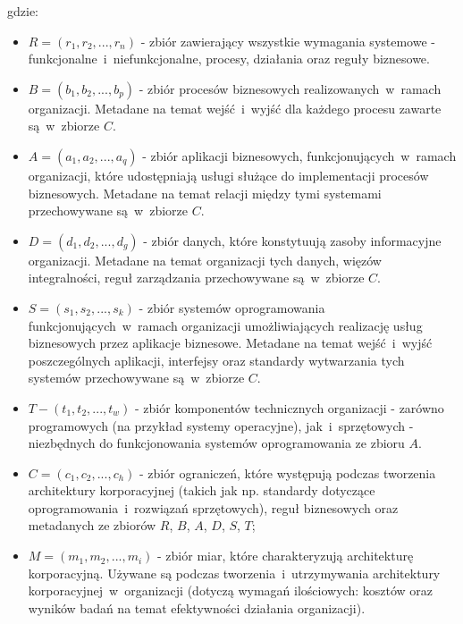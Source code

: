 gdzie:
\begin{itemize}
\item{$R = (r_{1}, r_{2},..., r_{n})$ - zbiór zawierający wszystkie wymagania systemowe - funkcjonalne~i~niefunkcjonalne, procesy, działania oraz reguły biznesowe.}
\item{$B = (b_{1}, b_{2},..., b_{p})$ - zbiór procesów biznesowych realizowanych~w~ramach organizacji. Metadane na temat wejść~i~wyjść dla każdego procesu zawarte są~w~zbiorze $C$.}
\item{$A = (a_{1}, a_{2},..., a_{q})$ - zbiór aplikacji biznesowych, funkcjonujących~w~ramach organizacji, które udostępniają usługi służące do implementacji procesów biznesowych. Metadane na temat relacji między tymi systemami przechowywane są~w~zbiorze $C$.}
\item{$D = (d_{1}, d_{2},..., d_{g})$ - zbiór danych, które konstytuują zasoby informacyjne organizacji. Metadane na temat organizacji tych danych, więzów integralności, reguł zarządzania przechowywane są~w~zbiorze $C$.}
\item{$S = (s_{1}, s_{2},..., s_{k})$ - zbiór systemów oprogramowania funkcjonujących~w~ramach organizacji umożliwiających realizację usług biznesowych przez aplikacje biznesowe. Metadane na temat wejść~i~wyjść poszczególnych aplikacji, interfejsy oraz standardy wytwarzania tych systemów przechowywane są~w~zbiorze $C$.}
\item{$T - (t_{1}, t_{2},..., t_{w})$ - zbiór komponentów technicznych organizacji - zarówno programowych (na przykład systemy operacyjne), jak~i~sprzętowych - niezbędnych do funkcjonowania systemów oprogramowania ze zbioru $A$.}
\item{$C = (c_{1}, c_{2},..., c_{h})$ - zbiór ograniczeń, które występują podczas tworzenia architektury korporacyjnej (takich jak np. standardy dotyczące oprogramowania~i~rozwiązań sprzętowych), reguł biznesowych oraz metadanych ze zbiorów $R$, $B$, $A$, $D$, $S$, $T$;}
\item{$M = (m_{1}, m_{2},..., m_{i})$ - zbiór miar, które charakteryzują architekturę korporacyjną. Używane są podczas tworzenia~i~utrzymywania architektury korporacyjnej~w~organizacji (dotyczą wymagań ilościowych: kosztów oraz wyników badań na temat efektywności działania organizacji).}
\end{itemize}

